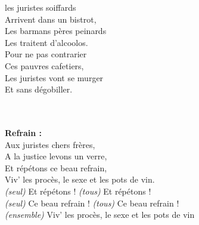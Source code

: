 
 les juristes soiffards
\\Arrivent dans un bistrot,
\\Les barmans pères peinards
\\Les traitent d'alcoolos.
\\Pour ne pas contrarier
\\Ces pauvres cafetiers,
\\Les juristes vont se murger
\\Et sans dégobiller.
\\\\\textbf{Refrain : }
\\Aux juristes chers frères,
\\A la justice levons un verre,
\\Et répétons ce beau refrain,
\\Viv' les procès, le sexe et les pots de vin.
\\\textit{(seul)} Et répétons ! \textit{(tous)} Et répétons !
\\\textit{(seul)} Ce beau refrain ! \textit{(tous)} Ce beau refrain !
\\\textit{(ensemble)} Viv' les procès, le sexe et les pots de vin
